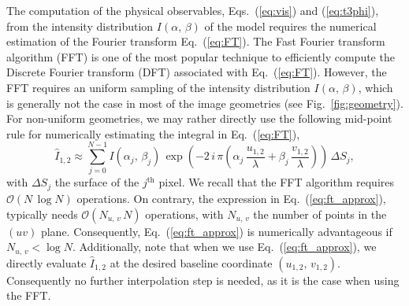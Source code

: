 \documentclass{report}
\newcommand{\ulam}{\frac{u_{1,2}}{\lambda}}
\newcommand{\vlam}{\frac{v_{1,2}}{\lambda}}
\newcommand{\Nuv}{N_{u, \, v}}
\begin{document}
The computation of the physical observables, Eqs.~(\ref{eq:vis}) and (\ref{eq:t3phi}), from the intensity distribution $I(\alpha, \, \beta)$ of the model requires the numerical estimation of the Fourier transform Eq.~(\ref{eq:FT}). The Fast Fourier transform algorithm (FFT) is one of the most popular technique to efficiently compute the Discrete Fourier transform (DFT) associated with Eq.~(\ref{eq:FT}). However, the FFT requires an uniform sampling of the intensity distribution $I(\alpha, \, \beta)$, which is generally not the case in most of the image geometries (see Fig.~\ref{fig:geometry}). For non-uniform geometries, we may rather directly use the following mid-point rule for numerically estimating the integral in Eq.~(\ref{eq:FT}),
\begin{equation}
    \hat{I}_{1,2} \approx \sum \limits_{j = 0}^{N-1} I\left(\alpha_j, \, \beta_j\right) \, \exp{\left(-2 \, i \, \pi \left(\alpha_j \, \ulam + \beta_j \, \vlam\right) \right)} \, \Delta S_j, \label{eq:ft_approx}
\end{equation}
with $\Delta S_j$ the surface of the $j^\mathrm{th}$ pixel. We recall that the FFT algorithm requires $\mathcal{O}\left(N \, \log{N}\right)$ operations. On contrary, the expression in Eq.~(\ref{eq:ft_approx}), typically needs $\mathcal{O}\left(\Nuv \, N\right)$ operations, with $\Nuv$ the number of points in the $\left(uv\right)$ plane. Consequently, Eq.~(\ref{eq:ft_approx}) is numerically advantageous if $\Nuv < \log{N}$. Additionally, note that when we use Eq.~(\ref{eq:ft_approx}), we directly evaluate $\hat{I}_{1,2}$ at the desired baseline coordinate $(u_{1,2}, \, v_{1,2})$. Consequently no further interpolation step is needed, as it is the case when using the FFT.
\end{document}
